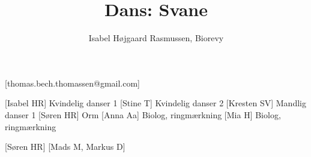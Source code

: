\documentclass[a4paper,12pt]{article}
\title{Dans: Svane}
\author{Isabel Højgaard Rasmussen, Biorevy}
\begin{document}
\maketitle

\begin{texxers}
	[thomas.bech.thomassen@gmail.com]
\end{texxers}

\begin{roles}
	[Isabel HR] Kvindelig danser 1
	[Stine T] Kvindelig danser 2
	[Kresten SV] Mandlig danser 1	
	[Søren HR] Orm
	[Anna Aa] Biolog, ringmærkning
	[Mia H] Biolog, ringmærkning
\end{roles}


\begin{props}
	[Søren HR] 
	[Mads M, Markus D]
\end{props}

\begin{song}




\end{song}
\end{document}
